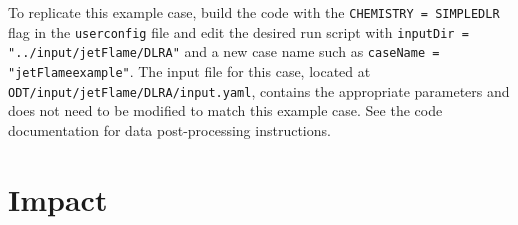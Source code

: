 \documentclass[preprint,12pt, a4paper]{elsarticle}
\begin{document}
To replicate this example case, build the code with the \texttt{CHEMISTRY = SIMPLEDLR} flag in the \texttt{user\textunderscore config} file and edit the desired run script with \texttt{inputDir = "../input/jetFlame/DLR\textunderscore A"} and a new case name such as \texttt{caseName = "jetFlame\textunderscore example"}. The input file for this case, located at \texttt{ODT/input/jetFlame/DLR\textunderscore A/input.yaml}, contains the appropriate parameters and does not need to be modified to match this example case. See the code documentation for data post-processing instructions.


\section{Impact}
\label{sec:impact}
\end{document}
